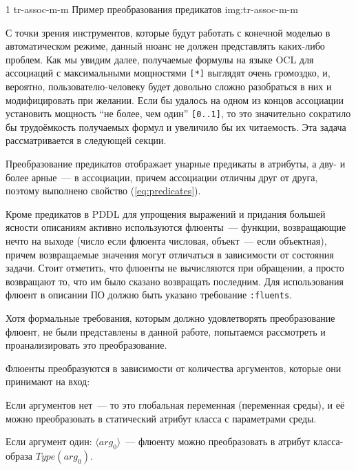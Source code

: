 {1}
{tr-assoc-m-m}
{Пример преобразования предикатов}
{img:tr-assoc-m-m}

С точки зрения инструментов, которые будут работать с конечной моделью в автоматическом режиме, данный нюанс не должен представлять каких-либо проблем.
Как мы увидим далее, получаемые формулы на языке OCL для ассоциаций с максимальными мощностями \texttt{[*]} выглядят очень громоздко, и, вероятно, пользователю-человеку будет довольно сложно разобраться в них и модифицировать при желании. 
Если бы удалось на одном из концов ассоциации установить мощность ``не более, чем один'' \texttt{[0..1]}, то это значительно сократило бы трудоёмкость получаемых формул и увеличило бы их читаемость. Эта задача рассматривается в следующей секции.

Преобразование предикатов отображает унарные предикаты в атрибуты, а дву- и более арные~--- в ассоциации, причем ассоциации отличны друг от друга, поэтому выполнено свойство (\ref{eq:predicates}).


Кроме предикатов в PDDL для упрощения выражений и придания большей ясности описаниям активно используются флюенты~--- функции, возвращающие нечто на выходе (число если флюента числовая, объект~--- если объектная), причем возвращаемые значения могут отличаться в зависимости от состояния задачи. Стоит отметить, что флюенты не вычисляются при обращении, а просто возвращают то, что им было сказано возвращать последним. Для использования флюент в описании ПО должно быть указано требование \texttt{:fluents}.

Хотя формальные требования, которым должно удовлетворять преобразование флюент, не были представлены в данной работе, попытаемся рассмотреть и проанализировать это преобразование.

Флюенты  преобразуются в зависимости от количества аргументов, которые они принимают на вход:

Если аргументов нет~--- то это глобальная переменная (переменная среды), и её можно преобразовать в статический атрибут класса с параметрами среды. 

Если аргумент один: $\langle arg_0 \rangle$~--- флюенту можно преобразовать в атрибут класса-образа $Type(arg_0)$.

